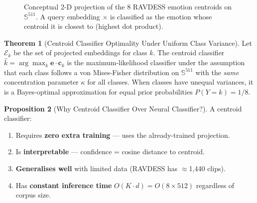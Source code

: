 \documentclass[12pt,a4paper]{article}
\theoremstyle{definition}
\newtheorem{theorem}{Theorem}[section]
\newtheorem{proposition}[theorem]{Proposition}
\theoremstyle{remark}
\begin{document}
\begin{figure}[H]
\centering
{}
\caption{Conceptual 2-D projection of the 8 RAVDESS emotion centroids on
$\mathbb{S}^{511}$. A query embedding $\times$ is classified as the emotion
whose centroid it is closest to (highest dot product).}
\label{fig:centroid_geo}
\end{figure}

\begin{theorem}[Centroid Classifier Optimality Under Uniform Class Variance]
Let $\mathcal{E}_k$ be the set of projected embeddings for class $k$.
The centroid classifier $\hat{k} = \arg\max_k \mathbf{e} \cdot \mathbf{c}_k$
is the maximum-likelihood classifier under the assumption that each class
follows a von Mises-Fisher distribution on $\mathbb{S}^{511}$ with the
\emph{same} concentration parameter $\kappa$ for all classes.
When classes have unequal variances, it is a Bayes-optimal approximation
for equal prior probabilities $P(Y = k) = 1/8$.
\end{theorem}

\begin{proposition}[Why Centroid Classifier Over Neural Classifier?]
A centroid classifier:
\begin{enumerate}
  \item Requires \textbf{zero extra training} — uses the already-trained projection.
  \item Is \textbf{interpretable} — confidence = cosine distance to centroid.
  \item \textbf{Generalises well} with limited data (RAVDESS has $\approx$1,440 clips).
  \item Has \textbf{constant inference time} $O(K \cdot d) = O(8 \times 512)$
        regardless of corpus size.
\end{enumerate}
\end{proposition}
\end{document}
